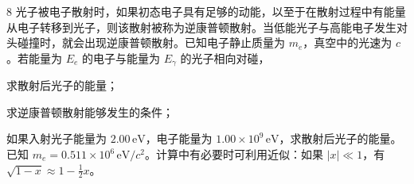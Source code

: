 \begin{problem}[第30届全国中学生物理竞赛复赛][逆康普顿散射]{8}
光子被电子散射时，如果初态电子具有足够的动能，以至于在散射过程中有能量从电子转移到光子，则该散射被称为逆康普顿散射。当低能光子与高能电子发生对头碰撞时，就会出现逆康普顿散射。已知电子静止质量为 $m_e$，真空中的光速为 $c$。若能量为 $E_e$ 的电子与能量为 $E_\gamma$ 的光子相向对碰，
\begin{subproblem}
求散射后光子的能量；
\end{subproblem}
\begin{subproblem}
求逆康普顿散射能够发生的条件；
\end{subproblem}
\begin{subproblem}
如果入射光子能量为 $2.00\,\mathrm{eV}$，电子能量为 $1.00 \times 10^{9}\,\mathrm{eV}$，求散射后光子的能量。已知 $m_e = 0.511 \times 10^{6}\,\mathrm{eV}/c^2$。计算中有必要时可利用近似：如果 $|x| \ll 1$，有 $\sqrt{1-x} \approx 1 - \frac{1}{2}x$。
\end{subproblem}
\end{problem}